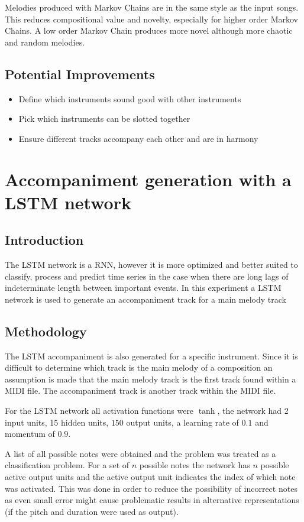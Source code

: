 Melodies produced with Markov Chains are in the same style as the input songs. This reduces compositional value and novelty, especially for higher order Markov Chains. A low order Markov Chain produces more novel although more chaotic and random melodies. 

\section{Potential Improvements}
\begin{itemize}
\item Define which instruments sound good with other instruments
\item Pick which instruments can be slotted together
\item Ensure different tracks accompany each other and are in harmony
\end{itemize}

\chapter{Accompaniment generation with a LSTM network} \label{ch:accomp_lstm}
\section{Introduction}
The \ac{LSTM} network is a \acf{RNN}, however it is more optimized and better suited to classify, process and predict time series in the case when there are long lags of indeterminate length between important events. In this experiment a \ac{LSTM} network is used to generate an accompaniment track for a main melody track

\section{Methodology}
The \ac{LSTM} accompaniment is also generated for a specific instrument. 
Since it is difficult to determine which track is the main melody of a composition an assumption is made that the main melody track is the first track found within a \ac{MIDI} file. The accompaniment track is another track within the \ac{MIDI} file.

For the LSTM network all activation functions were $\tanh$, the network had 2 input units, 15 hidden units, $150$ output units, a learning rate of $0.1$ and momentum of $0.9$.

A list of all possible notes were obtained and the problem was treated as a classification problem. For a set of $n$ possible notes the network has $n$ possible active output units and the active output unit indicates the index of which note was activated. This was done in order to reduce the possibility of incorrect notes as even small error might cause problematic results in alternative representations (if the pitch and duration were used as output).

